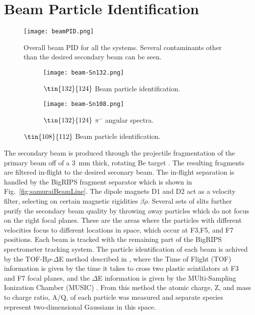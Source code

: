 \section{Beam Particle Identification}


\begin{figure}[!htb]
\centering
\texttt{[image: beamPID.png]}
\label{fig:beampid}
\caption{Overall beam PID for all the systems. Several contaminants other than the desired secondary beam can be seen.}
\end{figure}


\begin{figure}[!htb]

     \centering
     \begin{subfigure}[b]{0.49\textwidth}
         \centering
         \texttt{[image: beam-Sn132.png]}
         \caption{$\tin{132}{124}$ Beam particle identification.}
         \label{fig:beampid132}
     \end{subfigure}
     \hfill
     \begin{subfigure}[b]{0.49\textwidth}
         \centering
         \texttt{[image: beam-Sn108.png]}
         \caption{$\tin{132}{124}$ $\pi^-$ angular spectra.}
         \label{fig:beampid108}
     \end{subfigure}
        \caption{$\tin{108}{112}$ Beam particle identification. }
        \label{fig:beampidTwo}

\end{figure}


The secondary beam is produced through the projectile fragmentation of the primary beam off of a \SI{3}{\milli\metre} thick, rotating Be target \cite{inflightsep}. The resulting fragments are filtered in-flight to the desired seconary beam. The in-flight separation is handled by the BigRIPS fragment separator which is shown in Fig.~\ref{fig:samuraiBeamLine}. The dipole magnets D1 and D2 act as a velocity filter, selecting on certain magnetic rigidities $\beta\rho$. Several sets of slits further purify the secondary beam quality by throwing away particles which do not focus on the right focal planes. These are the areas where the particles with different velocities focus to different locations in space, which occur at F3,F5, and F7 positions.  Each beam is tracked with the remaining part of the BigRIPS spectrometer tracking system. The particle identification of each beam is achived by the TOF-B$\rho$-$\Delta$E method described in \cite{bigrips}, where the Time of Flight (TOF) information is given by the time it takes to cross two plastic scintilators at F3 and F7 focal planes, and the $\Delta$E information is given by the MUlti-Sampling Ionization Chamber (MUSIC) \cite{music}. From this method the atomic charge, Z, and mass to charge ratio, A/Q, of each particle was measured and separate species represent two-dimensional Gaussians in this space. 

